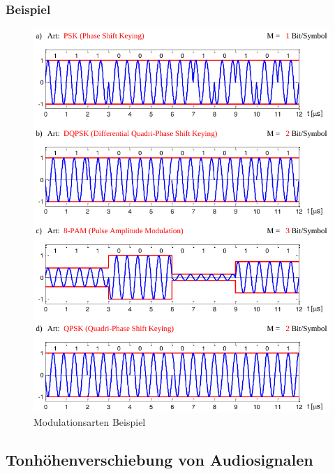 \subsubsection{Beispiel}
\begin{figure}[h!]
	\centering
	\begin{minipage}[t]{0.9\textwidth}
		\centering
		\includegraphics[width=0.9\linewidth]{images/modulationsarten}
		\caption{Modulationsarten Beispiel}
		\label{fig:modulationsartenbeispiel}
	\end{minipage}
\end{figure}
\clearpage

\subsection{Tonhöhenverschiebung von Audiosignalen}
